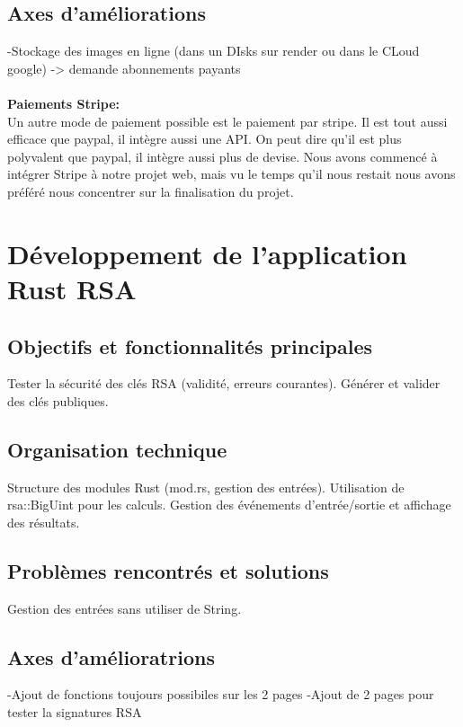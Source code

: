 \documentclass[12pt]{article} %
\begin{document}
	\subsection{Axes d'améliorations}
		-Stockage des images en ligne (dans un DIsks sur render ou dans le CLoud google) -> demande abonnements payants \\\\
        \textbf{Paiements Stripe:}\\
            Un autre mode de paiement possible est le paiement par stripe. Il est tout aussi efficace que paypal, il intègre aussi une API. On peut dire qu’il est plus polyvalent que paypal, il intègre aussi plus de devise.
            Nous avons commencé à intégrer Stripe à notre projet web, mais vu le temps qu’il nous restait nous avons préféré nous concentrer sur la finalisation du projet.

		

	

\section{Développement de l'application Rust RSA}
	\subsection{Objectifs et fonctionnalités principales}
		Tester la sécurité des clés RSA (validité, erreurs courantes).
Générer et valider des clés publiques.

	\subsection{Organisation technique}
		Structure des modules Rust (mod.rs, gestion des entrées).
Utilisation de rsa::BigUint pour les calculs.
Gestion des événements d’entrée/sortie et affichage des résultats.

	\subsection{Problèmes rencontrés et solutions}
		Gestion des entrées sans utiliser de String.

	\subsection{Axes d’amélioratrions }
		-Ajout de fonctions toujours possibiles sur les 2 pages
		-Ajout de 2 pages pour tester la signatures RSA 
\end{document}
